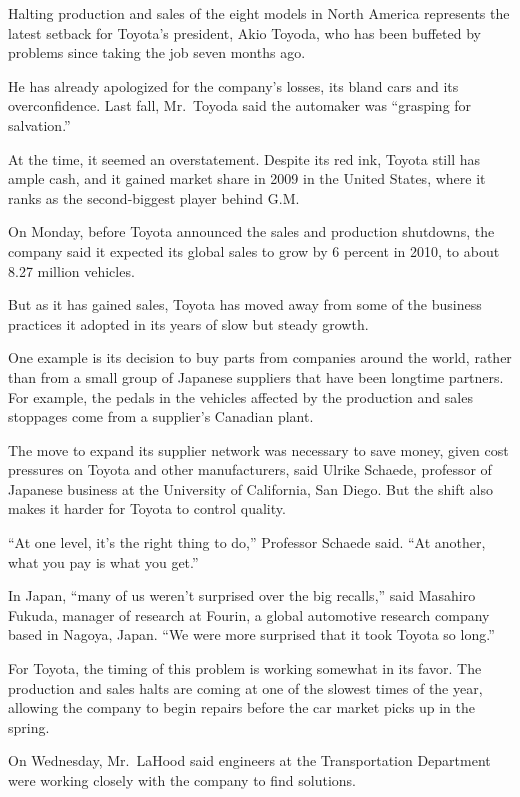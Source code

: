 ﻿\documentclass[12pt]{article}
\begin{document}
Halting production and sales of the eight models in North America represents the latest setback for
Toyota's president, Akio Toyoda, who has been buffeted by problems since taking the job seven months
ago.

He has already apologized for the company's losses, its bland cars and its overconfidence. Last
fall, Mr.~Toyoda said the automaker was ``grasping for salvation.''

At the time, it seemed an overstatement. Despite its red ink, Toyota still has ample cash, and it
gained market share in 2009 in the United States, where it ranks as the second-biggest player behind
G.M.

On Monday, before Toyota announced the sales and production shutdowns, the company said it expected
its global sales to grow by 6 percent in 2010, to about 8.27 million vehicles.

But as it has gained sales, Toyota has moved away from some of the business practices it adopted in
its years of slow but steady growth.

One example is its decision to buy parts from companies around the world, rather than from a small
group of Japanese suppliers that have been longtime partners. For example, the pedals in the
vehicles affected by the production and sales stoppages come from a supplier's Canadian plant.

The move to expand its supplier network was necessary to save money, given cost pressures on Toyota
and other manufacturers, said Ulrike Schaede, professor of Japanese business at the University of
California, San Diego. But the shift also makes it harder for Toyota to control quality.

``At one level, it's the right thing to do,'' Professor Schaede said. ``At another, what you pay is
what you get.''

In Japan, ``many of us weren't surprised over the big recalls,'' said Masahiro Fukuda, manager of
research at Fourin, a global automotive research company based in Nagoya, Japan. ``We were more
surprised that it took Toyota so long.''

For Toyota, the timing of this problem is working somewhat in its favor. The production and sales
halts are coming at one of the slowest times of the year, allowing the company to begin repairs
before the car market picks up in the spring.

On Wednesday, Mr.~LaHood said engineers at the Transportation Department were working closely with
the company to find solutions.
\end{document}
